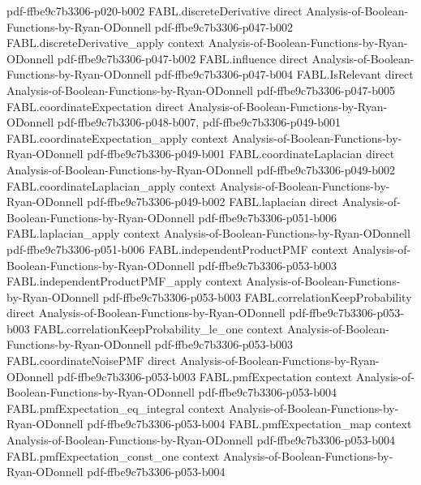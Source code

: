 \begin{theorem}
  {pdf-ffbe9c7b3306-p020-b002}
\proofstep
  {FABL.discreteDerivative}
  {direct}
  {Analysis-of-Boolean-Functions-by-Ryan-ODonnell}
  {pdf-ffbe9c7b3306-p047-b002}
\proofstep
  {FABL.discreteDerivative_apply}
  {context}
  {Analysis-of-Boolean-Functions-by-Ryan-ODonnell}
  {pdf-ffbe9c7b3306-p047-b002}
\proofstep
  {FABL.influence}
  {direct}
  {Analysis-of-Boolean-Functions-by-Ryan-ODonnell}
  {pdf-ffbe9c7b3306-p047-b004}
\proofstep
  {FABL.IsRelevant}
  {direct}
  {Analysis-of-Boolean-Functions-by-Ryan-ODonnell}
  {pdf-ffbe9c7b3306-p047-b005}
\proofstep
  {FABL.coordinateExpectation}
  {direct}
  {Analysis-of-Boolean-Functions-by-Ryan-ODonnell}
  {pdf-ffbe9c7b3306-p048-b007,
    pdf-ffbe9c7b3306-p049-b001}
\proofstep
  {FABL.coordinateExpectation_apply}
  {context}
  {Analysis-of-Boolean-Functions-by-Ryan-ODonnell}
  {pdf-ffbe9c7b3306-p049-b001}
\proofstep
  {FABL.coordinateLaplacian}
  {direct}
  {Analysis-of-Boolean-Functions-by-Ryan-ODonnell}
  {pdf-ffbe9c7b3306-p049-b002}
\proofstep
  {FABL.coordinateLaplacian_apply}
  {context}
  {Analysis-of-Boolean-Functions-by-Ryan-ODonnell}
  {pdf-ffbe9c7b3306-p049-b002}
\proofstep
  {FABL.laplacian}
  {direct}
  {Analysis-of-Boolean-Functions-by-Ryan-ODonnell}
  {pdf-ffbe9c7b3306-p051-b006}
\proofstep
  {FABL.laplacian_apply}
  {context}
  {Analysis-of-Boolean-Functions-by-Ryan-ODonnell}
  {pdf-ffbe9c7b3306-p051-b006}
\proofstep
  {FABL.independentProductPMF}
  {context}
  {Analysis-of-Boolean-Functions-by-Ryan-ODonnell}
  {pdf-ffbe9c7b3306-p053-b003}
\proofstep
  {FABL.independentProductPMF_apply}
  {context}
  {Analysis-of-Boolean-Functions-by-Ryan-ODonnell}
  {pdf-ffbe9c7b3306-p053-b003}
\proofstep
  {FABL.correlationKeepProbability}
  {direct}
  {Analysis-of-Boolean-Functions-by-Ryan-ODonnell}
  {pdf-ffbe9c7b3306-p053-b003}
\proofstep
  {FABL.correlationKeepProbability_le_one}
  {context}
  {Analysis-of-Boolean-Functions-by-Ryan-ODonnell}
  {pdf-ffbe9c7b3306-p053-b003}
\proofstep
  {FABL.coordinateNoisePMF}
  {direct}
  {Analysis-of-Boolean-Functions-by-Ryan-ODonnell}
  {pdf-ffbe9c7b3306-p053-b003}
\proofstep
  {FABL.pmfExpectation}
  {context}
  {Analysis-of-Boolean-Functions-by-Ryan-ODonnell}
  {pdf-ffbe9c7b3306-p053-b004}
\proofstep
  {FABL.pmfExpectation_eq_integral}
  {context}
  {Analysis-of-Boolean-Functions-by-Ryan-ODonnell}
  {pdf-ffbe9c7b3306-p053-b004}
\proofstep
  {FABL.pmfExpectation_map}
  {context}
  {Analysis-of-Boolean-Functions-by-Ryan-ODonnell}
  {pdf-ffbe9c7b3306-p053-b004}
\proofstep
  {FABL.pmfExpectation_const_one}
  {context}
  {Analysis-of-Boolean-Functions-by-Ryan-ODonnell}
  {pdf-ffbe9c7b3306-p053-b004}

\end{theorem}
